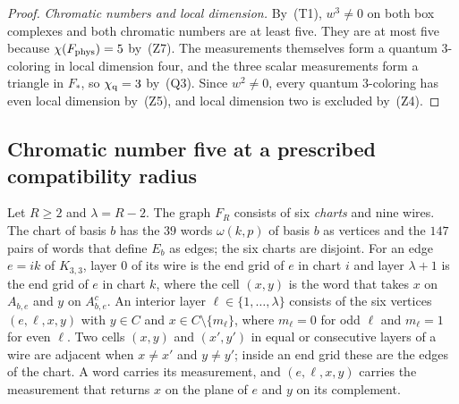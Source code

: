 \begin{proof}
\emph{Chromatic numbers and local dimension.} By~(T1), $w^3\ne0$ on both box complexes and both chromatic numbers are at least five. They are at most five because $\chi(F_{\rm phys})=5$ by~(Z7). The measurements themselves form a quantum $3$-coloring in local dimension four, and the three scalar measurements form a triangle in $F_*$, so $\chi_{\mathrm q}=3$ by~(Q3). Since $w^2\ne0$, every quantum $3$-coloring has even local dimension by~(Z5), and local dimension two is excluded by~(Z4).
\end{proof}

\subsection{Chromatic number five at a prescribed compatibility radius}\label{sec:FR}

Let $R\ge2$ and $\lambda=R-2$. The graph $F_R$ consists of six \emph{charts} and nine wires. The chart of basis $b$ has the $39$ words $\omega(k,p)$ of basis $b$ as vertices and the $147$ pairs of words that define $E_b$ as edges; the six charts are disjoint. For an edge $e=ik$ of $K_{3,3}$, layer $0$ of its wire is the end grid of $e$ in chart $i$ and layer $\lambda+1$ is the end grid of $e$ in chart $k$, where the cell $(x,y)$ is the word that takes $x$ on $A_{b,e}$ and $y$ on $A_{b,e}^c$. An interior layer $\ell\in\{1,\ldots,\lambda\}$ consists of the six vertices $(e,\ell,x,y)$ with $y\in C$ and $x\in C\setminus\{m_\ell\}$, where $m_\ell=0$ for odd $\ell$ and $m_\ell=1$ for even $\ell$. Two cells $(x,y)$ and $(x',y')$ in equal or consecutive layers of a wire are adjacent when $x\ne x'$ and $y\ne y'$; inside an end grid these are the edges of the chart. A word carries its measurement, and $(e,\ell,x,y)$ carries the measurement that returns $x$ on the plane of $e$ and $y$ on its complement.

